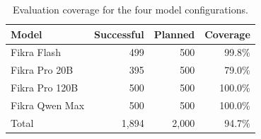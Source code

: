 \begin{table}[t]
\centering
\caption{Evaluation coverage for the four model configurations.}
\label{tab:coverage}
\begin{tabular}{lrrr}
\toprule
Model & Successful & Planned & Coverage \\
\midrule
Fikra Flash & 499 & 500 & 99.8\% \\
Fikra Pro 20B & 395 & 500 & 79.0\% \\
Fikra Pro 120B & 500 & 500 & 100.0\% \\
Fikra Qwen Max & 500 & 500 & 100.0\% \\
\midrule
Total & 1,894 & 2,000 & 94.7\% \\
\bottomrule
\end{tabular}
\end{table}

